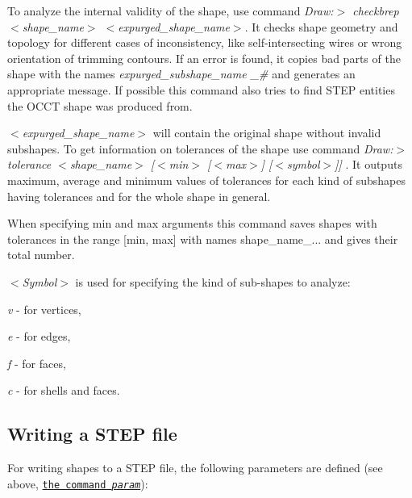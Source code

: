 To analyze the internal validity of the shape, use command {\itshape Draw\+:$>$ checkbrep $<$shape\+\_\+name$>$ $<$expurged\+\_\+shape\+\_\+name$>$}. It checks shape geometry and topology for different cases of inconsistency, like self-\/intersecting wires or wrong orientation of trimming contours. If an error is found, it copies bad parts of the shape with the names {\itshape expurged\+\_\+subshape\+\_\+name \+\_\+\#} and generates an appropriate message. If possible this command also tries to find S\+T\+EP entities the O\+C\+CT shape was produced from.

{\itshape $<$expurged\+\_\+shape\+\_\+name$>$} will contain the original shape without invalid subshapes. To get information on tolerances of the shape use command {\itshape Draw\+:$>$ tolerance $<$shape\+\_\+name$>$ \mbox{[}$<$min$>$ \mbox{[}$<$max$>$\mbox{]} \mbox{[}$<$symbol$>$\mbox{]}\mbox{]} }. It outputs maximum, average and minimum values of tolerances for each kind of subshapes having tolerances and for the whole shape in general.

When specifying min and max arguments this command saves shapes with tolerances in the range \mbox{[}min, max\mbox{]} with names shape\+\_\+name\+\_\+... and gives their total number.

{\itshape $<$Symbol$>$} is used for specifying the kind of sub-\/shapes to analyze\+:
\begin{DoxyItemize}
\item {\itshape v} -\/ for vertices,
\item {\itshape e} -\/ for edges,
\item {\itshape f} -\/ for faces,
\item {\itshape c} -\/ for shells and faces.
\end{DoxyItemize}\hypertarget{occt_user_guides__step_occt_step_6_5}{}\subsection{Writing a S\+T\+E\+P file}\label{occt_user_guides__step_occt_step_6_5}
For writing shapes to a S\+T\+EP file, the following parameters are defined (see above, \href{#occt_step_6_2}{\tt the command {\itshape param}})\+:


